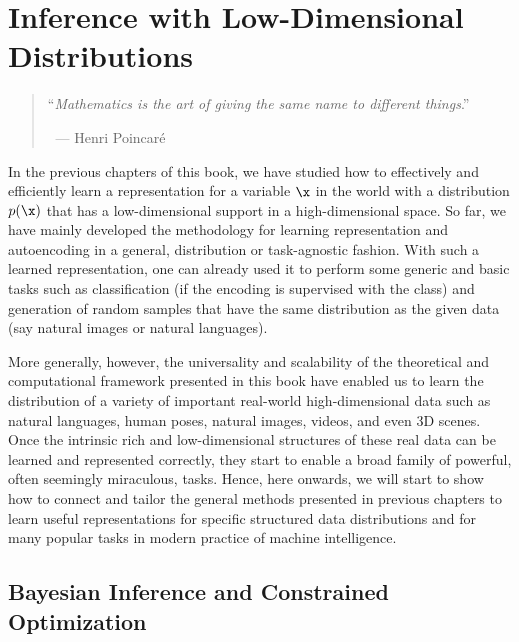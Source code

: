\documentclass[../../book-main.tex]{subfiles}
\begin{document}
\chapter{Inference with Low-Dimensional Distributions}
\label{ch:conditional-inference}

\begin{quote}

\hfill    ``{\em Mathematics is the art of giving the same name to different things}.''

$~$ \hfill --- Henri Poincar\'e 
\end{quote}
\vspace{5mm}


In the previous chapters of this book, we have studied how to effectively and efficiently learn a representation for a variable $\x$ in the world with a distribution $p(\x)$ that has a low-dimensional support in a high-dimensional space.  So far, we have mainly developed the methodology for learning representation and autoencoding in a general, distribution or task-agnostic fashion. With such a learned representation, one can already used it to perform some generic and basic tasks such as classification (if the encoding is supervised with the class) and generation of random samples that have the same distribution as the given data (say  natural images or natural languages). 

More generally, however, the universality and scalability of the theoretical and computational framework presented in this book have enabled us to learn the distribution of a variety of important real-world high-dimensional data such as natural languages, human poses, natural images, videos, and even 3D scenes. Once the intrinsic rich and low-dimensional structures of these real data can be learned and represented correctly, they start to enable a broad family of powerful, often seemingly miraculous, tasks. Hence, here onwards, we will start to show how to connect and tailor the general methods presented in previous chapters to learn useful representations for specific structured data distributions and for many popular tasks in modern practice of machine intelligence. 

\section{Bayesian Inference and Constrained Optimization}
\end{document}
